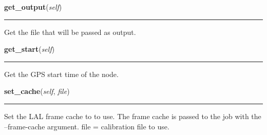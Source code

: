     \noindent\begin{boxedminipage}{\textwidth}

    \raggedright \textbf{get\_output}(\textit{self})

    \vspace{-1.5ex}

    \rule{\textwidth}{0.5\fboxrule}
    Get the file that will be passed as output.

    \vspace{1ex}

    \end{boxedminipage}

    \label{pipeline:AnalysisNode:get_start}
    \vspace{0.5ex}

    \noindent\begin{boxedminipage}{\textwidth}

    \raggedright \textbf{get\_start}(\textit{self})

    \vspace{-1.5ex}

    \rule{\textwidth}{0.5\fboxrule}
    Get the GPS start time of the node.

    \vspace{1ex}

    \end{boxedminipage}

    \label{pipeline:AnalysisNode:set_cache}
    \vspace{0.5ex}

    \noindent\begin{boxedminipage}{\textwidth}

    \raggedright \textbf{set\_cache}(\textit{self}, \textit{file})

    \vspace{-1.5ex}

    \rule{\textwidth}{0.5\fboxrule}
    Set the LAL frame cache to to use. The frame cache is passed to the 
    job with the --frame-cache argument. file = calibration file to use.

    \vspace{1ex}

    \end{boxedminipage}

    \label{pipeline:AnalysisNode:set_end}
    \vspace{0.5ex}

